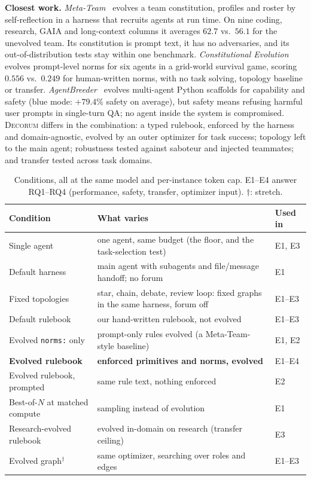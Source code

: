 \documentclass{article}
\newcommand{\dec}{\textsc{Decorum}}
\begin{document}
\textbf{Closest work.}
\emph{Meta-Team}~\citep{hao2026evolve} evolves a team constitution, profiles and roster by self-reflection in a harness that recruits agents at run time.
On nine coding, research, GAIA and long-context columns it averages $62.7$ vs.\ $56.1$ for the unevolved team.
Its constitution is prompt text, it has no adversaries, and its out-of-distribution tests stay within one benchmark.
\emph{Constitutional Evolution}~\citep{kumar2026evolving} evolves prompt-level norms for six agents in a grid-world survival game, scoring $0.556$ vs.\ $0.249$ for human-written norms, with no task solving, topology baseline or transfer.
\emph{AgentBreeder}~\citep{rosser2025agentbreeder} evolves multi-agent Python scaffolds for capability and safety (blue mode: $+79.4\%$ safety on average), but safety means refusing harmful user prompts in single-turn QA; no agent inside the system is compromised.
\dec{} differs in the combination: a typed rulebook, enforced by the harness and domain-agnostic, evolved by an outer optimizer for task success; topology left to the main agent; robustness tested against saboteur and injected teammates; and transfer tested across task domains.

\begin{table}[b]
\centering
\footnotesize
\setlength{\tabcolsep}{4pt}
\caption{Conditions, all at the same model and per-instance token cap. E1--E4 answer RQ1--RQ4 (performance, safety, transfer, optimizer input). $\dagger$: stretch.}
\label{tab:conditions}
\begin{tabularx}{\linewidth}{@{}lXl@{}}
\toprule
Condition & What varies & Used in \\
\midrule
Single agent & one agent, same budget (the floor, and the task-selection test) & E1, E3 \\
Default harness & main agent with subagents and file/message handoff; no forum & E1 \\
Fixed topologies & star, chain, debate, review loop: fixed graphs in the same harness, forum off & E1--E3 \\
Default rulebook & our hand-written rulebook, not evolved & E1--E3 \\
Evolved \texttt{norms:} only & prompt-only rules evolved (a Meta-Team-style baseline) & E1, E2 \\
\textbf{Evolved rulebook} & \textbf{enforced primitives and norms, evolved} & E1--E4 \\
Evolved rulebook, prompted & same rule text, nothing enforced & E2 \\
Best-of-$N$ at matched compute & sampling instead of evolution~\citep{wang2026rethinking} & E1 \\
Research-evolved rulebook & evolved in-domain on research (transfer ceiling) & E3 \\
Evolved graph$^\dagger$ & same optimizer, searching over roles and edges & E1--E3 \\
\bottomrule
\end{tabularx}
\end{table}
\end{document}

